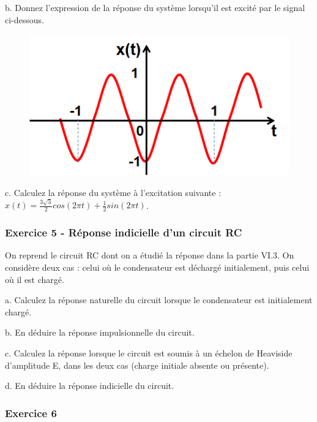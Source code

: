 	b. Donnez l'expression de la réponse du système lorsqu'il est excité par le signal ci-dessous.
	
	\begin{figure}[h!]
		\centering
		\includegraphics[scale=0.5]{images/Exo_2_4.png} 
	\end{figure} 
	
	c. Calculez la réponse du système à l'excitation suivante : $x(t)=\frac{3\sqrt{3}}{2}cos(2\pi t)+\frac{1}{2}sin(2\pi t)$.\\
	
	
	
	\subsubsection{Exercice 5 - Réponse indicielle d'un circuit RC}
	
	On reprend le circuit RC dont on a étudié la réponse dans la partie VI.3. On considère deux cas : celui où le condensateur est déchargé initialement, puis celui où il est chargé. 
	
	a. Calculez la réponse naturelle du circuit lorsque le condensateur est initialement chargé.
	
	b. En déduire la réponse impulsionnelle du circuit.
	
	c. Calculez la réponse lorsque le circuit est soumis à un échelon de Heaviside d'amplitude E, dans les deux cas (charge initiale absente ou présente).
	
	d. En déduire la réponse indicielle du circuit.
	
	\vspace{1\baselineskip}	
	

	
	\subsubsection{Exercice 6}
	
